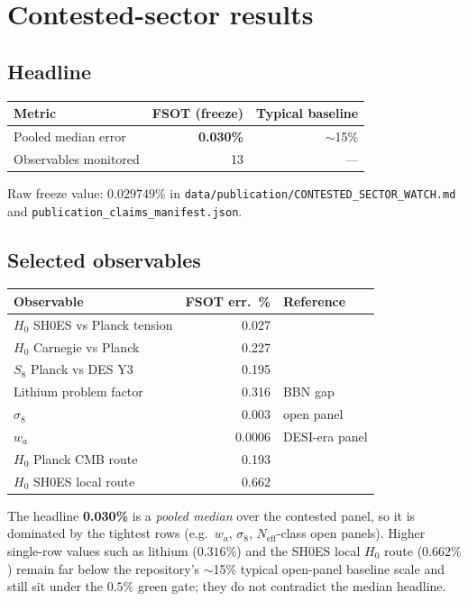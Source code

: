 \documentclass[11pt,a4paper]{article}
\begin{document}
\section{Contested-sector results}
\label{sec:contested}

\subsection{Headline}

\begin{center}
\begin{tabular}{@{}lrr@{}}
\toprule
Metric & FSOT (freeze) & Typical baseline \\
\midrule
Pooled median error & \textbf{0.030\%} & $\sim$15\% \\
Observables monitored & 13 & --- \\
\bottomrule
\end{tabular}
\end{center}

Raw freeze value: $0.029749\%$ in
\texttt{data/publication/CONTESTED\_SECTOR\_WATCH.md} and
\texttt{publication\_claims\_manifest.json}.

\subsection{Selected observables}

\begin{center}
\begin{tabular}{@{}lrl@{}}
\toprule
Observable & FSOT err.\ \% & Reference \\
\midrule
$H_0$ SH0ES vs Planck tension & 0.027 & \cite{Riess2022,Planck2018} \\
$H_0$ Carnegie vs Planck & 0.227 & \cite{Freedman2019} \\
$S_8$ Planck vs DES Y3 & 0.195 & \cite{DESY3} \\
Lithium problem factor & 0.316 & BBN gap \\
$\sigma_8$ & 0.003 & open panel \\
$w_a$ & 0.0006 & DESI-era panel \\
$H_0$ Planck CMB route & 0.193 & \cite{Planck2018} \\
$H_0$ SH0ES local route & 0.662 & \cite{Riess2022} \\
\bottomrule
\end{tabular}
\end{center}

\noindent
The headline \textbf{0.030\%} is a \emph{pooled median} over the contested
panel, so it is dominated by the tightest rows (e.g.\ $w_a$, $\sigma_8$,
$N_{\mathrm{eff}}$-class open panels).
Higher single-row values such as lithium ($0.316\%$) and the SH0ES local
$H_0$ route ($0.662\%$) remain far below the repository's $\sim$15\% typical
open-panel baseline scale and still sit under the $0.5\%$ green gate; they
do not contradict the median headline.
\end{document}
